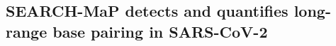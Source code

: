 \documentclass[main.tex]{subfiles}
\begin{document}
%
%
%

\subsection{SEARCH-MaP detects and quantifies long-range base pairing in SARS-CoV-2}
\end{document}
